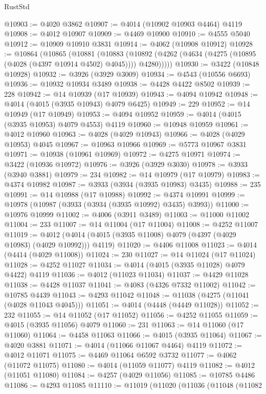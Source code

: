 \begin{lexlean}{RustStd}
\begin{coremodule}
@10903 := @4020 @3862
@10907 := @4014 (@10902 @10903 @4464) @4119
@10908 := @4012 @10907
@10909 := @4469 @10900
@10910 := @4555 @5040
@10912 := @10909 @10910 @3831
@10914 := @4062 (@10908 @10912)
@10928 := @10864
    (@10865
      (@10881
        (@10883
          (@10892 (@4262 (@4634 (@4275 (@10895 (@4028 (@4397 @10914 @4502) @4045)))) @4280)))))
@10930 := @3422 (@10848 @10928)
@10932 := @3926 (@3929 @3009)
@10934 := @4543 (@10556 @6693)
@10936 := @10932 @10934 @3489
@10938 := @4428 @4422 @8502
@10939 := 228
@10942 := @14 @10939 (@17 @10939)
@10943 := @4094 @10942
@10948 := @4014 (@4015 (@3935 @10943) @4079 @6425)
@10949 := 229
@10952 := @14 @10949 (@17 @10949)
@10953 := @4094 @10952
@10959 := @4014 (@4015 (@3935 @10953) @4079 @4553) @4119
@10960 := @10948 @10959
@10961 := @4012 @10960
@10963 := @4028 (@4029 @10943)
@10966 := @4028 (@4029 @10953) @4045
@10967 := @10963 @10966
@10969 := @5773 @10967 @3831
@10971 := @10938 (@10961 @10969)
@10972 := @4275 @10971
@10974 := @3422 (@10936 @10972)
@10976 := @3926 (@3929 @3030)
@10978 := @3933 (@3940 @3881)
@10979 := 234
@10982 := @14 @10979 (@17 @10979)
@10983 := @4374 @10982
@10987 := @3933 (@3934 (@3935 @10983) @3435)
@10988 := 235
@10991 := @14 @10988 (@17 @10988)
@10992 := @4374 @10991
@10999 := @10978 (@10987 (@3933 (@3934 (@3935 @10992) @3435) @3993))
@11000 := @10976 @10999
@11002 := @4006 (@3911 @3489)
@11003 := @11000 @11002
@11004 := 233
@11007 := @14 @11004 (@17 @11004)
@11008 := @4252 @11007
@11019 := @4012 (@4014 (@4015 (@3935 @11008) @4079 (@4397 (@4029 @10983) (@4029 @10992))) @4119)
@11020 := @4406 @11008
@11023 := @4014 (@4414 (@4029 @11008))
@11024 := 230
@11027 := @14 @11024 (@17 @11024)
@11028 := @4252 @11027
@11034 := @4014 (@4015 (@3935 @11028) @4079 @4422) @4119
@11036 := @4012 (@11023 @11034)
@11037 := @4429 @11028
@11038 := @4428 @11037
@11041 := @4083 (@4326 @7332 @11002)
@11042 := @10785 @4439
@11043 := @4293 @11042
@11048 := @11038 (@4275 (@11041 (@4028 @11043 @4045)))
@11051 := @4014 (@4448 (@4449 @11028))
@11052 := 232
@11055 := @14 @11052 (@17 @11052)
@11056 := @4252 @11055
@11059 := @4015 (@3935 @11056) @4079
@11060 := 231
@11063 := @14 @11060 (@17 @11060)
@11064 := @4458 @11063
@11066 := @4015 (@3935 @11064)
@11067 := @4020 @3881
@11071 := @4014 (@11066 @11067 @4464) @4119
@11072 := @4012 @11071
@11075 := @4469 @11064 @6592 @3732
@11077 := @4062 (@11072 @11075)
@11080 := @4014 (@11059 @11077) @4119
@11082 := @4012 (@11051 @11080)
@11084 := @4257 (@4029 @11056)
@11085 := @10785 @4486
@11086 := @4293 @11085
@11110 := @11019
    (@11020
      (@11036
        (@11048
          (@11082

\end{coremodule}
\end{lexlean}
